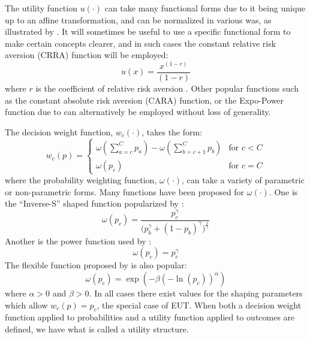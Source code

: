 \documentclass[../main.tex]{subfiles}
\begin{document}
The utility function $u(\cdot)$ can take many functional forms due to it being unique up to an affine transformation, and can be normalized in various was, as illustrated by \textcite{Hey1994}.
It will sometimes be useful to use a specific functional form to make certain concepts clearer, and in such cases the constant relative risk aversion (CRRA) function will be employed:
\begin{equation}
	\label{eq2:CRRA}
	u(x) = \frac{x^{(1-r)}}{(1-r)}
\end{equation}
\noindent where $r$ is the coefficient of relative risk aversion \parencite{Pratt1964}.
Other popular functions such as the constant absolute risk aversion (CARA) function, or the Expo-Power function due to \textcite{Saha1993} can alternatively be employed without loss of generality.

The decision weight function, $w_c(\cdot)$, takes the form:
\begin{equation}
	\label{eq2:dweight}
	w_c(p) =
	\begin{cases}
		\omega\left(\displaystyle\sum_{a=c}^C p_a\right) - \omega\left(\displaystyle\sum_{b=c+1}^C p_b\right) & \text{for } c<C \\
		\omega(p_c) & \text{for } c = C
	\end{cases}
\end{equation}
\noindent where the probability weighting function, $\omega(\cdot)$, can take a variety of parametric or non-parametric forms.
Many functions have been proposed for $\omega(\cdot)$.
One is the \enquote{Inverse-S} shaped function popularized by \textcite{Tversky1992}:
\begin{equation}
	\label{eq2:pw:kahneman}
	\omega(p_c) = \frac{p_c^\gamma}{\biggl(p_b^\gamma + (1 - p_b)^\gamma \biggr)^{ \frac{1}{\gamma} } }
\end{equation}
\noindent Another is the power function used by \textcite{Quiggin1982}:
\begin{equation}
	\label{eq2:pw:quiggin}
	\omega(p_c)=p_c^\gamma
\end{equation}
\noindent The flexible function proposed by \textcite{Prelec1998} is also popular:
\begin{equation}
	\label{eq2:pw:prelec}
	\omega(p_c)=\exp(-\beta(-\ln(p_c))^\alpha)
\end{equation}
\noindent where $\alpha > 0$ and $\beta > 0$.
In all cases there exist values for the shaping parameters which allow $w_c(p) = p_c$, the special case of EUT.
When both a decision weight function applied to probabilities and a utility function applied to outcomes are defined, we have what is called a utility structure.
\end{document}
